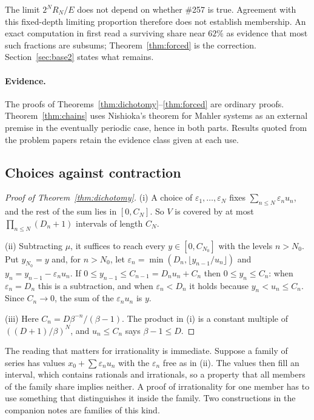 \documentclass[11pt]{article}
\begin{document}
The limit $2^NR_N/E$ does not depend on whether \#257 is true.  Agreement with
this fixed-depth limiting proportion therefore does not establish membership.
An exact computation in \cite{plectisinvestigation} first read a surviving
share near $62\%$ as evidence that most such fractions are subsums;
Theorem~\ref{thm:forced} is the correction.  Section~\ref{sec:base2} states
what remains.

\paragraph{Evidence.} The proofs of Theorems~\ref{thm:dichotomy}--\ref{thm:forced}
are ordinary proofs. Theorem~\ref{thm:chains} uses Nishioka's theorem for
Mahler systems as an external premise in the eventually periodic case, hence
in both parts. Results quoted from the problem papers retain the evidence
class given at each use.

\subsection{Choices against contraction}\label{sec:dichotomy}

\begin{proof}[Proof of Theorem~\ref{thm:dichotomy}]
(i) A choice of $\varepsilon_1,\dots,\varepsilon_N$ fixes
$\sum_{n\le N}\varepsilon_nu_n$, and the rest of the sum lies in $[0,C_N]$.
So $V$ is covered by at most $\prod_{n\le N}(D_n+1)$ intervals of length $C_N$.

(ii) Subtracting $\mu$, it suffices to reach every $y\in[0,C_{N_0}]$ with the
levels $n>N_0$.  Put $y_{N_0}=y$ and, for $n>N_0$, let
$\varepsilon_n=\min(D_n,\lfloor y_{n-1}/u_n\rfloor)$ and
$y_n=y_{n-1}-\varepsilon_nu_n$.  If $0\le y_{n-1}\le C_{n-1}=D_nu_n+C_n$ then
$0\le y_n\le C_n$: when $\varepsilon_n=D_n$ this is a subtraction, and when
$\varepsilon_n<D_n$ it holds because $y_n<u_n\le C_n$.  Since $C_n\to0$, the
sum of the $\varepsilon_nu_n$ is $y$.

(iii) Here $C_n=D\beta^{-n}/(\beta-1)$.  The product in (i) is a constant
multiple of $((D+1)/\beta)^N$, and $u_n\le C_n$ says $\beta-1\le D$.
\end{proof}

The reading that matters for irrationality is immediate.  Suppose a family of
series has values $x_0+\sum\varepsilon_nu_n$ with the $\varepsilon_n$ free as in
(ii).  The values then fill an interval, which contains rationals and
irrationals, so a property that all members of the family share implies
neither.  A proof of irrationality for one member has to use something that
distinguishes it inside the family.  Two constructions in the companion notes
are families of this kind.
\end{document}
